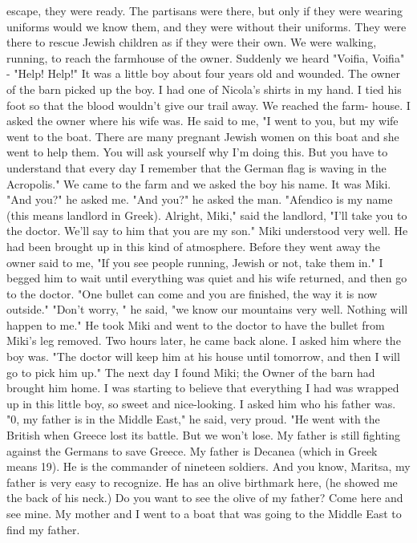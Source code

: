 escape, they were ready.
The partisans were there, but only if they 
were wearing uniforms would we know them, and they were without their 
uniforms.
They were there to rescue Jewish children as if they were 
their own.
We were walking, running, to reach the farmhouse of the owner.
Suddenly we heard "Voifia, Voifia" - "Help!
Help!"
It was a little 
boy about four years old and wounded.
The owner of the barn picked 
up the boy.
I had one of Nicola's shirts in my hand.
I tied his foot 
so that the blood wouldn't give our trail away.
We reached the farm-
house.
I asked the owner where his wife was.
He said to me, "I went 
to you, but my wife went to the boat.
There are many pregnant Jewish 
women on this boat and she went to help them.
You will ask yourself 
why I'm doing this.
But you have to understand that every day I 
remember that the German flag is waving in the Acropolis."
We came to the farm and we asked the boy his name.
It was Miki.
"And you?"
he asked me.
"And you?"
he asked the man.
"Afendico is 
my name (this means landlord in Greek).
Alright, Miki," said the landlord, 
"I'll take you to the doctor.
We'll say to him that you are my son."
Miki understood very well.
He had been brought up in this kind of 
atmosphere.
Before they went away the owner said to me, "If you see 
people running, Jewish or not, take them in."
I begged him to wait 
until everything was quiet and his wife returned, and then go to the 
doctor.
"One bullet can come and you are finished, the way it is now 
outside."
"Don't worry, " he said, "we know our mountains very well.
Nothing will happen to me."
He took Miki and went to the doctor to 
have the bullet from Miki's leg removed.
Two hours later, he came 
back alone.
I asked him where the boy was.
"The doctor will keep him at his house until tomorrow, and then 
I will go to pick him up."
The next day I found Miki; the Owner of 
the barn had brought him home.
I was starting to believe that everything I had was wrapped up in this little boy, so sweet and nice-looking.
I asked him who his father was.
"0, my father is in the Middle East," he said, very proud.
"He went with the British when Greece 
lost its battle.
But we won't lose.
My father is still fighting against 
the Germans to save Greece.
My father is Decanea (which in Greek means 
19).
He is the commander of nineteen soldiers.
And you know, Maritsa, 
my father is very easy to recognize.
He has an olive birthmark here, 
(he showed me the back of his neck.)
Do you want to see the olive of 
my father?
Come here and see mine.
My mother and I went to a boat that 
was going to the Middle East to find my father.
